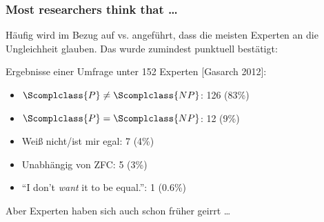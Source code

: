 \documentclass[aspectratio=1610,onlymath]{beamer}
\begin{document}
\begin{frame}\frametitle{Most researchers think that \ldots}

Häufig wird im Bezug auf  vs.  angeführt, dass die meisten
Experten an die Ungleichheit glauben. Das wurde zumindest punktuell bestätigt:\bigskip

  \alert{Ergebnisse einer Umfrage unter 152 Experten [Gasarch 2012]:}
	\begin{itemize}
	\item $\Scomplclass{P} \neq \Scomplclass{NP}$: 126 (83\%)
	\item $\Scomplclass{P} = \Scomplclass{NP}$: 12 (9\%)
	\item Weiß nicht/ist mir egal: 7 (4\%)
	\item Unabhängig von ZFC: 5 (3\%)
	\item "`I don't \emph{want} it to be equal."': 1 (0.6\%)
	\end{itemize}\medskip
	
Aber Experten haben sich auch schon früher geirrt \ldots

\end{frame}


% 
%    
\end{document}
